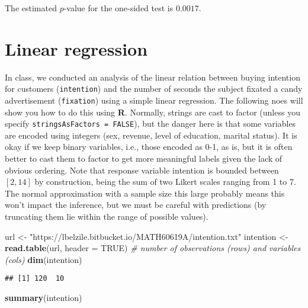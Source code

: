 \documentclass[
]{book}
\newenvironment{Shaded}{\begin{snugshade}}{\end{snugshade}}
\newcommand{\CommentTok}[1]{\textcolor[rgb]{0.56,0.35,0.01}{\textit{#1}}}
\newcommand{\DataTypeTok}[1]{\textcolor[rgb]{0.13,0.29,0.53}{#1}}
\newcommand{\KeywordTok}[1]{\textcolor[rgb]{0.13,0.29,0.53}{\textbf{#1}}}
\newcommand{\NormalTok}[1]{#1}
\newcommand{\OtherTok}[1]{\textcolor[rgb]{0.56,0.35,0.01}{#1}}
\newcommand{\StringTok}[1]{\textcolor[rgb]{0.31,0.60,0.02}{#1}}
\begin{document}
The estimated \(p\)-value for the one-sided test is \(0.0017\).

\hypertarget{linear-regression}{%
\chapter{Linear regression}\label{linear-regression}}

In class, we conducted an analysis of the linear relation between buying intention for customers (\texttt{intention}) and the number of seconds the subject fixated a candy advertisement (\texttt{fixation}) using a simple linear regression. The following noes will show you how to do this using \textbf{R}. Normally, strings are cast to factor (unless you specify \texttt{stringsAsFactors\ =\ FALSE}), but the danger here is that some variables are encoded using integers (sex, revenue, level of education, marital status). It is okay if we keep binary variables, i.e., those encoded as 0-1, as is, but it is often better to cast them to factor to get more meaningful labels given the lack of obvious ordering. Note that response variable intention is bounded between \([2, 14]\) by construction, being the sum of two Likert scales ranging from 1 to 7. The normal approximation with a sample size this large probably means this won't impact the inference, but we must be careful with predictions (by truncating them lie within the range of possible values).

\begin{Shaded}
\begin{Highlighting}[]
\NormalTok{url <-}\StringTok{ "https://lbelzile.bitbucket.io/MATH60619A/intention.txt"}
\NormalTok{intention <-}\StringTok{ }\KeywordTok{read.table}\NormalTok{(url, }\DataTypeTok{header =} \OtherTok{TRUE}\NormalTok{)}
\CommentTok{# number of observations (rows) and variables (cols)}
\KeywordTok{dim}\NormalTok{(intention) }
\end{Highlighting}
\end{Shaded}

\begin{verbatim}
## [1] 120  10
\end{verbatim}

\begin{Shaded}
\begin{Highlighting}[]
\KeywordTok{summary}\NormalTok{(intention)}
\end{Highlighting}
\end{Shaded}
\end{document}

